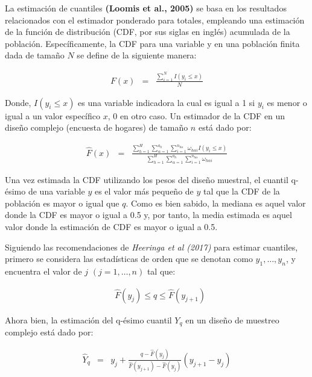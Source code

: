 \documentclass[
  12pt,
]{book}
\begin{document}
La estimación de cuantiles \textbf{(Loomis et al., 2005)} se basa en los resultados relacionados con el estimador ponderado para totales, empleando una estimación de la función de distribución (CDF, por sus siglas en inglés) acumulada de la población. Específicamente, la CDF para una variable y en una población finita dada de tamaño \(N\) se define de la siguiente manera:

\begin{eqnarray*}
F\left(x\right) & = & \frac{{ \sum_{i=1}^{N}}I\left(y_{i}\leq x\right)}{N}
\end{eqnarray*}

Donde, \(I\left(y_{i}\leq x\right)\) es una variable indicadora la
cual es igual a 1 si \(y_{i}\) es menor o igual a un valor específico
\(x\), 0 en otro caso. Un estimador de la CDF en un diseño complejo
(encuesta de hogares) de tamaño \(n\) está dado por:

\begin{eqnarray*}
\hat{F}\left(x\right) & = & \frac{\sum_{h=1}^{H}\sum_{\alpha=1}^{a_{h}}\sum_{i=1}^{n_{h\alpha}}\omega_{h\alpha i}I\left(y_{i}\leq x\right)}{\sum_{h=1}^{H}\sum_{\alpha=1}^{a_{h}}\sum_{i=1}^{n_{h\alpha}}\omega_{h\alpha i}}
\end{eqnarray*}

Una vez estimada la CDF utilizando los pesos del diseño muestral, el cuantil q-ésimo de una variable \(y\) es el valor más pequeño de \(y\) tal que la CDF de la población es mayor o igual que \(q\). Como es bien sabido, la mediana es aquel valor donde la CDF es mayor o igual a 0.5 y, por tanto, la media estimada es aquel valor donde la estimación de CDF es mayor o igual a 0.5.

Siguiendo las recomendaciones de \emph{Heeringa et al (2017)} para estimar cuantiles, primero se considera las estadísticas de orden que se denotan como \(y_{1},\ldots,y_{n}\), y encuentra el valor de \(j\) \((j=1,\ldots,n)\) tal que:

\begin{eqnarray*}
 & \hat{F}\left(y_{j}\right)\leq q\leq\hat{F}\left(y_{j+1}\right)
\end{eqnarray*}

Ahora bien, la estimación del q-ésimo cuantil \(Y_{q}\) en un diseño de muestreo complejo está dado por:

\begin{eqnarray*}
\hat{Y}_{q} & = & y_{j}+\frac{q-\hat{F}\left(y_{j}\right)}{\hat{F}\left(y_{j+1}\right)-\hat{F}\left(y_{j}\right)}\left(y_{j+1}-y_{j}\right)
\end{eqnarray*}
\end{document}
